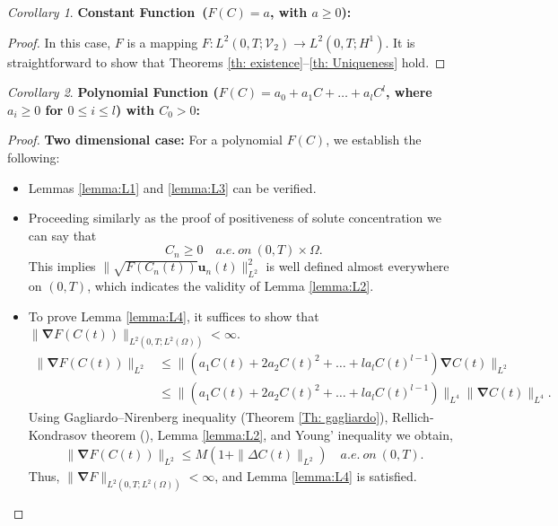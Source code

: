 \documentclass[final,3p,times]{elsarticle}
\theoremstyle{plain}
\theoremstyle{remark}
\newtheorem{corollary}{Corollary}
\theoremstyle{plain}
\theoremstyle{remark}
\begin{document}
\begin{corollary}
\textbf{Constant Function\ (\( F\left(C\right) = a \), with \( a \geq 0 \)):}
\end{corollary}
\begin{proof}
       In this case, \( F \) is a mapping \( F : L^2\left(0,T;\mathscr V_2\right) \to L^2\left(0,T;H^1\right) \). It is straightforward to show that Theorems \ref{th: existence}--\ref{th: Uniqueness} hold.
\end{proof} 

   
    \begin{corollary}
    \textbf{Polynomial Function (\( F\left(C\right) = a_0 + a_1C + \dots + a_lC^l \), where \( a_i \geq 0 \) for \( 0 \leq i \leq l \)) with $C_0>0$:}
    \end{corollary}
    \begin{proof}
    
\textbf{Two dimensional case:}
    For a polynomial \( F\left(C\right) \), we establish the following:
    \begin{itemize}
        \item Lemmas \ref{lemma:L1} and \ref{lemma:L3} can be verified.  
        \item Proceeding similarly as the proof of positiveness of solute concentration  
        we can say that\[
C_n \ge 0 \quad a.e. \ on \ (0,T) \times \Omega.
\] This implies $\|\sqrt{ F\left(C_n\left(t\right)\right) }\mathbf u_n\left(t\right) \|_{L^2}^2$ is well defined almost everywhere on  $\left(0,T\right)$, which indicates the validity of Lemma \ref{lemma:L2}.
        \item To prove Lemma \ref{lemma:L4}, it suffices to show that 
        \(
        \|\boldsymbol{\nabla} F\left(C\left(t\right)\right)\|_{L^2\left(0,T;L^2\left(\Omega\right)\right)} < \infty.
        \)
        \begin{align}
            \|\boldsymbol{\nabla} F\left(C\left(t\right)\right)\|_{L^2} &\leq \|\left(a_1C\left(t\right) + 2a_2C\left(t\right)^2 + \dots + la_lC\left(t\right)^{l-1}\right) \boldsymbol{\nabla} C\left(t\right)\|_{L^2} \nonumber\\
            &\leq \|\left(a_1C\left(t\right) + 2a_2C\left(t\right)^2 + \dots + la_lC\left(t\right)^{l-1}\right)\|_{L^4} \|\boldsymbol{\nabla} C\left(t\right)\|_{L^4}.
        \end{align}
        Using Gagliardo–Nirenberg inequality (Theorem \ref{Th: gagliardo}), Rellich-Kondrasov theorem (\emph{\citep[Theorem 2.6.3]{kesavan2015topics}}), Lemma \ref{lemma:L2}, and Young' inequality we obtain,
     \begin{align}
        \|\boldsymbol{\nabla} F\left(C\left(t\right)\right)\|_{L^2} \leq M\left(1+ \|\Delta C\left(t\right)\|_{L^2}\right) \quad a.e. \ on \ \left(0,T\right).
         \end{align}
        Thus, \( \|\boldsymbol{\nabla} F\|_{L^2\left(0,T;L^2\left(\Omega\right)\right)} < \infty \), and Lemma \ref{lemma:L4} is satisfied.
        

\end{itemize}
\end{proof}
\end{document}
